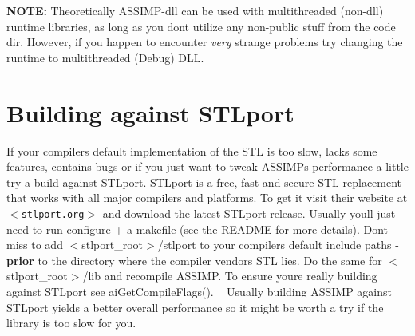 {\bfseries N\+O\+T\+E\+:} Theoretically A\+S\+S\+I\+M\+P-\/dll can be used with multithreaded (non-\/dll) runtime libraries, as long as you don\textquotesingle{}t utilize any non-\/public stuff from the code dir. However, if you happen to encounter {\itshape very} strange problems try changing the runtime to multithreaded (Debug) D\+L\+L.\hypertarget{install_assimp_stlport}{}\section{Building against S\+T\+Lport}\label{install_assimp_stlport}
If your compiler\textquotesingle{}s default implementation of the S\+T\+L is too slow, lacks some features, contains bugs or if you just want to tweak A\+S\+S\+I\+M\+P\textquotesingle{}s performance a little try a build against S\+T\+Lport. S\+T\+Lport is a free, fast and secure S\+T\+L replacement that works with all major compilers and platforms. To get it visit their website at \href{http://www.stlport.org}{\tt $<$stlport.\+org$>$} and download the latest S\+T\+Lport release. Usually you\textquotesingle{}ll just need to run \textquotesingle{}configure\textquotesingle{} + a makefile (see the R\+E\+A\+D\+M\+E for more details). Don\textquotesingle{}t miss to add $<$stlport\+\_\+root$>$/stlport to your compiler\textquotesingle{}s default include paths -\/ {\bfseries prior} to the directory where the compiler vendor\textquotesingle{}s S\+T\+L lies. Do the same for $<$stlport\+\_\+root$>$/lib and recompile A\+S\+S\+I\+M\+P. To ensure you\textquotesingle{}re really building against S\+T\+Lport see ai\+Get\+Compile\+Flags(). ~\newline
 Usually building A\+S\+S\+I\+M\+P against S\+T\+Lport yields a better overall performance so it might be worth a try if the library is too slow for you. 